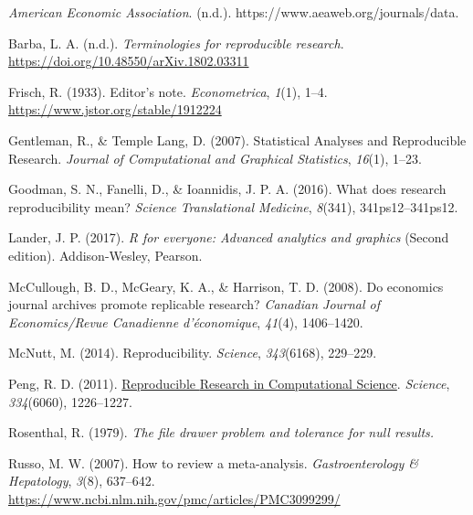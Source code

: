 \documentclass[
  british,
  a4paper,
]{article}
\newlength{\cslhangindent}
\newenvironment{CSLReferences}[2] %
 {\begin{list}{}{%
  \setlength{\itemindent}{0pt}
  \setlength{\leftmargin}{0pt}
  \setlength{\parsep}{0pt}
  \ifodd #1
   \setlength{\leftmargin}{\cslhangindent}
   \setlength{\itemindent}{-1\cslhangindent}
  \fi
  \setlength{\itemsep}{#2\baselineskip}}}
 {\end{list}}
\begin{document}
\label{refs}
\begin{CSLReferences}{1}{0}
\emph{American {Economic Association}}. (n.d.).
https://www.aeaweb.org/journals/data.

Barba, L. A. (n.d.). \emph{Terminologies for reproducible research}.
\url{https://doi.org/10.48550/arXiv.1802.03311}

Frisch, R. (1933). Editor's note. \emph{Econometrica}, \emph{1}(1),
1--4. \url{https://www.jstor.org/stable/1912224}

Gentleman, R., \& Temple Lang, D. (2007). Statistical {Analyses} and
{Reproducible Research}. \emph{Journal of Computational and Graphical
Statistics}, \emph{16}(1), 1--23.

Goodman, S. N., Fanelli, D., \& Ioannidis, J. P. A. (2016). What does
research reproducibility mean? \emph{Science Translational Medicine},
\emph{8}(341), 341ps12--341ps12.

Lander, J. P. (2017). \emph{R for everyone: Advanced analytics and
graphics} (Second edition). Addison-Wesley, Pearson.

McCullough, B. D., McGeary, K. A., \& Harrison, T. D. (2008). Do
economics journal archives promote replicable research? \emph{Canadian
Journal of Economics/Revue Canadienne d'{é}conomique}, \emph{41}(4),
1406--1420.

McNutt, M. (2014). Reproducibility. \emph{Science}, \emph{343}(6168),
229--229.

Peng, R. D. (2011).
\href{https://www.ncbi.nlm.nih.gov/pubmed/22144613}{Reproducible
{Research} in {Computational Science}}. \emph{Science},
\emph{334}(6060), 1226--1227.

Rosenthal, R. (1979). \emph{The file drawer problem and tolerance for
null results.}

Russo, M. W. (2007). How to review a meta-analysis.
\emph{Gastroenterology \& Hepatology}, \emph{3}(8), 637--642.
\url{https://www.ncbi.nlm.nih.gov/pmc/articles/PMC3099299/}


\end{CSLReferences}
\end{document}
